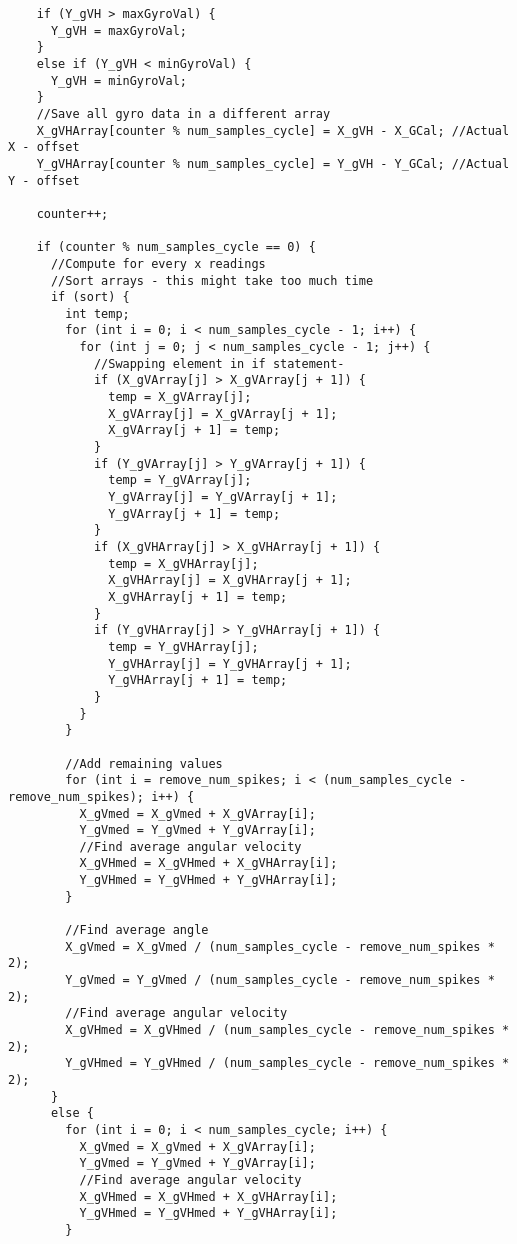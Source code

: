 \begin{lstlisting}
    if (Y_gVH > maxGyroVal) {
      Y_gVH = maxGyroVal;
    }
    else if (Y_gVH < minGyroVal) {
      Y_gVH = minGyroVal;
    }
    //Save all gyro data in a different array
    X_gVHArray[counter % num_samples_cycle] = X_gVH - X_GCal; //Actual X - offset
    Y_gVHArray[counter % num_samples_cycle] = Y_gVH - Y_GCal; //Actual Y - offset
 
    counter++;
 
    if (counter % num_samples_cycle == 0) {
      //Compute for every x readings
      //Sort arrays - this might take too much time
      if (sort) {
        int temp;
        for (int i = 0; i < num_samples_cycle - 1; i++) {
          for (int j = 0; j < num_samples_cycle - 1; j++) {
            //Swapping element in if statement-
            if (X_gVArray[j] > X_gVArray[j + 1]) {
              temp = X_gVArray[j];
              X_gVArray[j] = X_gVArray[j + 1];
              X_gVArray[j + 1] = temp;
            }
            if (Y_gVArray[j] > Y_gVArray[j + 1]) {
              temp = Y_gVArray[j];
              Y_gVArray[j] = Y_gVArray[j + 1];
              Y_gVArray[j + 1] = temp;
            }
            if (X_gVHArray[j] > X_gVHArray[j + 1]) {
              temp = X_gVHArray[j];
              X_gVHArray[j] = X_gVHArray[j + 1];
              X_gVHArray[j + 1] = temp;
            }
            if (Y_gVHArray[j] > Y_gVHArray[j + 1]) {
              temp = Y_gVHArray[j];
              Y_gVHArray[j] = Y_gVHArray[j + 1];
              Y_gVHArray[j + 1] = temp;
            }
          }
        }
 
        //Add remaining values
        for (int i = remove_num_spikes; i < (num_samples_cycle - remove_num_spikes); i++) {
          X_gVmed = X_gVmed + X_gVArray[i];
          Y_gVmed = Y_gVmed + Y_gVArray[i];
          //Find average angular velocity
          X_gVHmed = X_gVHmed + X_gVHArray[i];
          Y_gVHmed = Y_gVHmed + Y_gVHArray[i];
        }
 
        //Find average angle
        X_gVmed = X_gVmed / (num_samples_cycle - remove_num_spikes * 2);
        Y_gVmed = Y_gVmed / (num_samples_cycle - remove_num_spikes * 2);
        //Find average angular velocity
        X_gVHmed = X_gVHmed / (num_samples_cycle - remove_num_spikes * 2);
        Y_gVHmed = Y_gVHmed / (num_samples_cycle - remove_num_spikes * 2);
      }
      else {
        for (int i = 0; i < num_samples_cycle; i++) {
          X_gVmed = X_gVmed + X_gVArray[i];
          Y_gVmed = Y_gVmed + Y_gVArray[i];
          //Find average angular velocity
          X_gVHmed = X_gVHmed + X_gVHArray[i];
          Y_gVHmed = Y_gVHmed + Y_gVHArray[i];
        }
 

\end{lstlisting}
